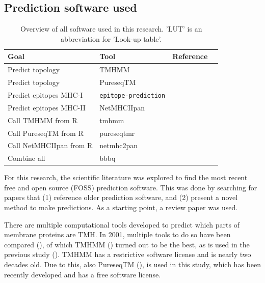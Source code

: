 \subsection{Prediction software used}
\label{subsec:prediction_software_used}

\begin{table}[]
  \begin{tabular}{llll}
    Goal & Tool & Reference \\ 
    \hline
    Predict topology                  & TMHMM                     & \cite{krogh2001predicting} \\
    Predict topology                  & PureseqTM                 & \cite{wang2019efficient} \\
    Predict epitopes MHC-I            & \verb;epitope-prediction; & \cite{bianchi2017} \\
    Predict epitopes MHC-II           & NetMHCIIpan               & \cite{nielsen2008quantitative,karosiene2013netmhciipan} \\
    Call TMHMM from R                 & tmhmm                     & \cite{tmhmm} \\
    Call PureseqTM from R             & pureseqtmr                & \cite{pureseqtmr} \\
    Call NetMHCIIpan from R           & netmhc2pan                & \cite{netmhc2pan} \\
    Combine all                       & bbbq                      & \cite{bbbq}
  \end{tabular}
  \caption{
    Overview of all software used in this research.
    'LUT' is an abbreviation for 'Look-up table'. 
  }
  \label{table:software_used}
\end{table}

For this research, the scientific literature was explored 
to find the most recent free and open source (FOSS) prediction software.
This was done by searching for papers that (1) reference older
prediction software, and (2) present a novel method to make predictions.
As a starting point, a review paper was used.


There are multiple computational tools developed to predict which
parts of membrane proteins are TMH.
In 2001, multiple tools to do so have been compared (\cite{moller2001evaluation}),
of which TMHMM (\cite{krogh2001predicting}) turned out to be the best, 
as is used in the previous study (\cite{bianchi2017}).
TMHMM has a restrictive software license and is nearly two
decades old.
Due to this, also PureseqTM (\cite{wang2019efficient}),
is used in this study, which has been recently developed
and has a free software license.


